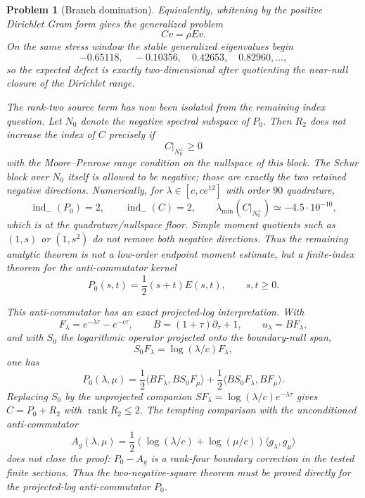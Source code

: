 \documentclass[11pt]{article}
\newtheorem{problem}[theorem]{Problem}
\begin{document}
\begin{problem}[Branch domination]
Equivalently, whitening by the positive Dirichlet Gram form gives the
generalized problem
\[
  C v=\rho E v.
\]
On the same stress window the stable generalized eigenvalues begin
\[
  -0.65118,\quad -0.10356,\quad 0.42653,\quad 0.82960,\ldots,
\]
so the expected defect is exactly two-dimensional after quotienting the
near-null closure of the Dirichlet range.

The rank-two source term has now been isolated from the remaining index
question.  Let $N_0$ denote the negative spectral subspace of $P_0$.  Then
$R_2$ does not increase the index of $C$ precisely if
\[
  C|_{N_0^\perp}\ge0
\]
with the Moore--Penrose range condition on the nullspace of this block.  The
Schur block over $N_0$ itself is allowed to be negative; those are exactly the
two retained negative directions.  Numerically, for
$\lambda\in[c,ce^{12}]$ with order $90$ quadrature,
\[
  \operatorname{ind}_-(P_0)=2,\qquad
  \operatorname{ind}_-(C)=2,\qquad
  \lambda_{\min}(C|_{N_0^\perp})\simeq -4.5\cdot10^{-10},
\]
which is at the quadrature/nullspace floor.  Simple moment quotients such as
$(1,s)$ or $(1,s^2)$ do not remove both negative directions.  Thus the
remaining analytic theorem is not a low-order endpoint moment estimate, but a
finite-index theorem for the anti-commutator kernel
\[
  P_0(s,t)=\frac12(s+t)E(s,t),\qquad s,t\ge0.
\]

This anti-commutator has an exact projected-log interpretation.  With
\[
  F_\lambda=e^{-\lambda\tau}-e^{-c\tau},\qquad
  B=(1+\tau)\partial_\tau+1,\qquad
  u_\lambda=BF_\lambda,
\]
and with $S_0$ the logarithmic operator projected onto the boundary-null span,
\[
  S_0F_\lambda=\log(\lambda/c)F_\lambda,
\]
one has
\[
  P_0(\lambda,\mu)
  =\frac12\langle BF_\lambda,BS_0F_\mu\rangle
   +\frac12\langle BS_0F_\lambda,BF_\mu\rangle.
\]
Replacing $S_0$ by the unprojected companion
$SF_\lambda=\log(\lambda/c)e^{-\lambda\tau}$ gives $C=P_0+R_2$ with
$\operatorname{rank}R_2\le2$.  The tempting comparison with the unconditioned
anti-commutator
\[
  A_g(\lambda,\mu)=\frac12(\log(\lambda/c)+\log(\mu/c))
  \langle g_\lambda,g_\mu\rangle
\]
does not close the proof: $P_0-A_g$ is a rank-four boundary correction in the
tested finite sections.  Thus the two-negative-square theorem must be proved
directly for the projected-log anti-commutator $P_0$.


\end{problem}
\end{document}
